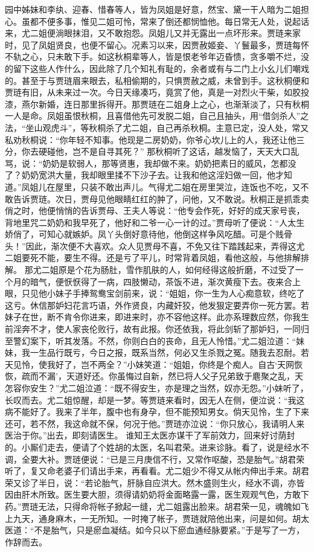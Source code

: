 \documentclass[12pt,oneside]{book}
\begin{document}
园中姊妹和李纨、迎春、惜春等人，皆为凤姐是好意，然宝、黛一干人暗为二姐担心。虽都不便多事，惟见二姐可怜，常来了倒还都悯恤他。每日常无人处，说起话来，尤二姐便淌眼抹泪，又不敢抱怨。凤姐儿又并无露出一点坏形来。贾琏来家时，见了凤姐贤良，也便不留心。况素习以来，因贾赦姬妾、丫鬟最多，贾琏每怀不轨之心，只未敢下手。如这秋桐辈等人，皆是恨老爷年迈昏愦，贪多嚼不烂，没的留下这些人作什么，因此除了几个知礼有耻的，余者或有与二门上小幺儿们嘲戏的。甚至于与贾琏眉来眼去，私相偷期的，只惧贾赦之威，未曾到手。这秋桐便和贾琏有旧，从未来过一次。今日天缘凑巧，竟赏了他，真是一对烈火干柴，如胶投漆，燕尔新婚，连日那里拆得开。那贾琏在二姐身上之心，也渐渐淡了，只有秋桐一人是命。凤姐虽恨秋桐，且喜借他先可发脱二姐，自己且抽头，用“借剑杀人”之法，“坐山观虎斗”，等秋桐杀了尤二姐，自己再杀秋桐。主意已定，没人处，常又私劝秋桐说：“你年轻不知事。他现是二房奶奶，你爷心坎儿上的人，我还让他三分，你去硬碰他，岂不是自寻其死？”
那秋桐听了这话，越发恼了，天天大口乱骂，说：“奶奶是软弱人，那等贤惠，我却做不来。奶奶把素日的威风，怎都没了？奶奶宽洪大量，我却眼里揉不下沙子去。让我和他这淫妇做一回，他才知道。”凤姐儿在屋里，只装不敢出声儿。气得尤二姐在房里哭泣，连饭也不吃，又不敢告诉贾琏。次日，贾母见他眼睛红红的肿了，问他，又不敢说。秋桐正是抓乖卖俏之时，他便悄悄的告诉贾母、王夫人等说：“他专会作死，好好的成天家号丧，背地里咒二奶奶和我早死了，他好和二爷一心一计的过。”贾母听了便说：“人太生娇俏了，可知心就嫉妒。凤丫头倒好意待他，他倒这样争风吃醋。可是个贱骨头！”因此，渐次便不大喜欢。众人见贾母不喜，不免又往下踏践起来，弄得这尤二姐要死不能，要生不得。还是亏了平儿，时常背着凤姐，看他这般，与他排解排解。
那尤二姐原是个花为肠肚，雪作肌肤的人，如何经得这般折磨，不过受了一个月的暗气，便恹恹得了一病，四肢懒动，茶饭不进，渐次黄瘦下去。夜来合上眼，只见他小妹子手捧鸳鸯宝剑前来，说：“姐姐，你一生为人心痴意软，终吃了这亏。休信那妒妇花言巧语，外作贤良，内藏奸狡，他发狠定要弄你一死方罢。若妹子在世，断不肯令你进来，即进来时，亦不容他这样。此亦系理数应然，你我生前淫奔不才，使人家丧伦败行，故有此报。你还依我，将此剑斩了那妒妇，一同归至警幻案下，听其发落。不然，你则白白的丧命，且无人怜惜。”尤二姐泣道：“妹妹，我一生品行既亏，今日之报，既系当然，何必又生杀戮之冤。随我去忍耐。若天见怜，使我好了，岂不两全？”小妹笑道：“姐姐，你终是个痴人。自古‘天网恢恢，疏而不漏’，天道好还。你虽悔过自新，然已将人父子兄弟致于麀聚之乱，天怎容你安生？”尤二姐泣道：“既不得安生，亦是理之当然，奴亦无怨。”小妹听了，长叹而去。尤二姐惊醒，却是一梦。等贾琏来看时，因无人在侧，便泣说：“我这病不能好了。我来了半年，腹中也有身孕，但不能预知男女。倘天见怜，生了下来还可，若不然，我这命就不保，何况于他。”贾琏亦泣说：“你只放心，我请明人来医治于你。”出去，即刻请医生。
谁知王太医亦谋干了军前效力，回来好讨荫封的。小厮们走去，便请了个姓胡的太医，名叫君荣。进来诊脉。看了，说是经水不调，全要大补。贾琏便说：“已是三月庚信不行，又常作呕酸，恐是胎气。”胡君荣听了，复又命老婆子们请出手来，再看看。尤二姐少不得又从帐内伸出手来。胡君荣又诊了半日，说：“若论胎气，肝脉自应洪大。然木盛则生火，经水不调，亦皆因由肝木所致。医生要大胆，须得请奶奶将金面略露一露，医生观观气色，方敢下药。”贾琏无法，只得命将帐子掀起一缝，尤二姐露出脸来。胡君荣一见，魂魄如飞上九天，通身麻木，一无所知。一时掩了帐子，贾琏就陪他出来，问是如何。胡太医道：“不是胎气，只是瘀血凝结。如今只以下瘀血通经脉要紧。”于是写了一方，作辞而去。
\end{document}

